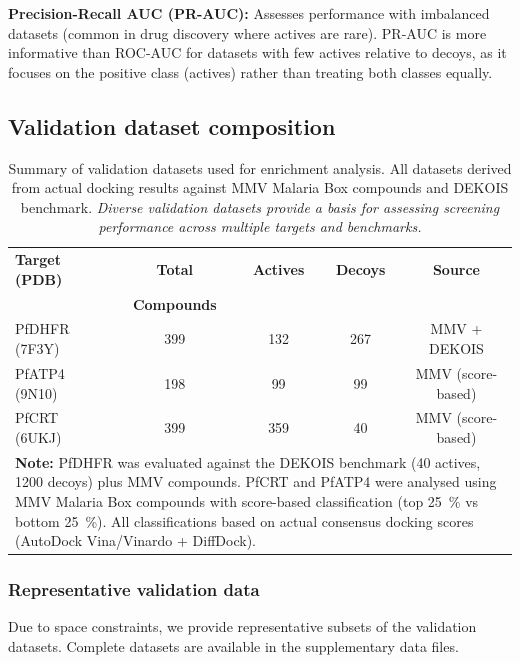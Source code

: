 \documentclass[journal=jcisd8,manuscript=suppinfo]{achemso}
\begin{document}
\textbf{Precision-Recall AUC (PR-AUC):}
Assesses performance with imbalanced datasets (common in drug discovery where actives are rare). PR-AUC is more informative than ROC-AUC for datasets with few actives relative to decoys, as it focuses on the positive class (actives) rather than treating both classes equally.

\subsection*{Validation dataset composition}

\begin{table}[!htbp]
\centering
\caption{Summary of validation datasets used for enrichment analysis. All datasets derived from actual docking results against MMV Malaria Box compounds and DEKOIS benchmark. \textit{Diverse validation datasets provide a basis for assessing screening performance across multiple targets and benchmarks.}}
\label{tab:si_validation_summary}
\small
\begin{tabular}{lcccc}
\toprule
\textbf{Target (PDB)} & \textbf{Total} & \textbf{Actives} & \textbf{Decoys} & \textbf{Source} \\
 & \textbf{Compounds} & & & \\
\midrule
PfDHFR (7F3Y) & \num{399} & \num{132} & \num{267} & MMV + DEKOIS \\
PfATP4 (9N10) & \num{198} & \num{99} & \num{99} & MMV (score-based) \\
PfCRT (6UKJ) & \num{399} & \num{359} & \num{40} & MMV (score-based) \\
\bottomrule
\multicolumn{5}{p{14cm}}{
\noindent\textbf{Note:} PfDHFR was evaluated against the DEKOIS benchmark (\num{40} actives, \num{1200} decoys) plus MMV compounds. PfCRT and PfATP4 were analysed using MMV Malaria Box compounds with score-based classification (top \qty{25}{\percent} vs bottom \qty{25}{\percent}). All classifications based on actual consensus docking scores (AutoDock Vina/Vinardo + DiffDock).
}
\end{tabular}
\end{table}

\subsubsection*{Representative validation data}

Due to space constraints, we provide representative subsets of the validation datasets. Complete datasets are available in the supplementary data files.
\end{document}
